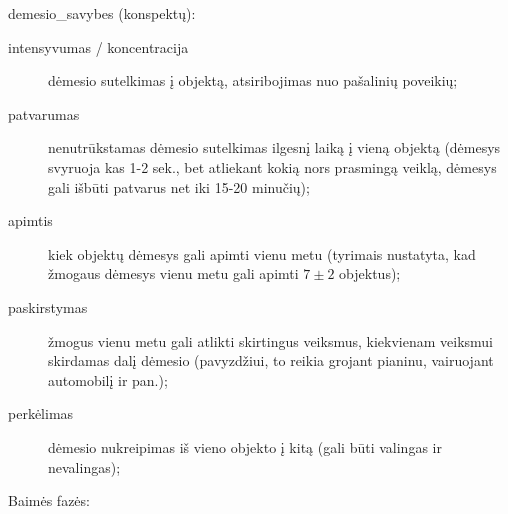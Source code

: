 



\label{tema:demesio_savybes}

\Glspl{demesio_savybe} (konspektų):

\begin{description}
  \item[intensyvumas / koncentracija] dėmesio sutelkimas į objektą, 
    atsiribojimas nuo pašalinių poveikių;
  \item[patvarumas] nenutrūkstamas dėmesio sutelkimas ilgesnį laiką 
    į vieną objektą (dėmesys svyruoja kas 1-2 sek., bet atliekant kokią
    nors prasmingą veiklą, dėmesys gali išbūti patvarus net iki 15-20 
    minučių);
  \item[apimtis] kiek objektų dėmesys gali apimti vienu metu (tyrimais
    nustatyta, kad žmogaus dėmesys vienu metu gali apimti $7 \pm 2$ 
    objektus);
  \item[paskirstymas] žmogus vienu metu gali atlikti skirtingus veiksmus,
    kiekvienam veiksmui skirdamas dalį dėmesio (pavyzdžiui, to reikia 
    grojant pianinu, vairuojant automobilį ir pan.);
  \item[perkėlimas] dėmesio nukreipimas iš vieno objekto į kitą
    (gali būti valingas ir nevalingas);
\end{description}



Baimės fazės:

